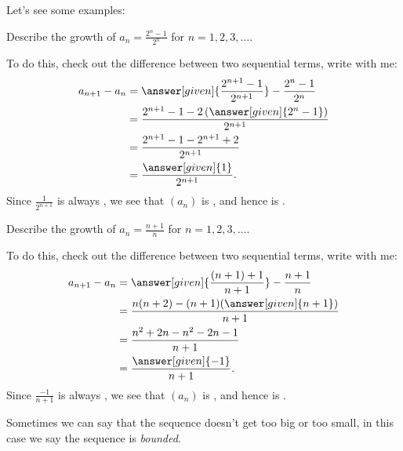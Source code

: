 \documentclass{ximera}
\begin{document}
Let's see some examples:
\begin{example}
  Describe the growth of $a_n = \frac{2^n-1}{2^n}$ for
  $n=1,2,3,\dots$.
  \begin{explanation}
    To do this, check out the difference between two sequential terms,
    write with me:
    \begin{align*}
    a_{n+1} - a_n &= \answer[given]{\frac{2^{n+1}-1}{2^{n+1}}} - \frac{2^n-1}{2^n}\\
    &=\frac{2^{n+1}-1 - 2\left(\answer[given]{2^n-1}\right)}{2^{n+1}}\\
    &=\frac{2^{n+1}-1 - 2^{n+1}+2}{2^{n+1}}\\
    &=\frac{\answer[given]{1}}{2^{n+1}}.
    \end{align*}
    Since $\frac{1}{2^{n+1}}$ is always
    ,
    we see that $(a_n)$ is
    , and hence is .
  \end{explanation}
\end{example}

\begin{example}
  Describe the growth of $a_n = \frac{n+1}{n}$ for $n=1,2,3,\dots$.
  \begin{explanation}
    To do this, check out the difference between two sequential terms,
    write with me:
    \begin{align*}
    a_{n+1} - a_n &= \answer[given]{\frac{(n+1)+1}{n+1}} - \frac{n+1}{n}\\
    &=\frac{n(n+2) - (n+1)(\answer[given]{n+1})}{n+1}\\
    &=\frac{n^2+2n - n^2 -2n-1}{n+1}\\
    &=\frac{\answer[given]{-1}}{n+1}.
    \end{align*}
    Since $\frac{-1}{n+1}$ is always
    ,
    we see that $(a_n)$ is
    , and hence is .
  \end{explanation}
\end{example}

Sometimes we can say that the sequence doesn't get too big or too
small, in this case we say the sequence is \textit{bounded}.
\end{document}
